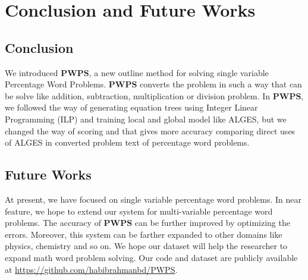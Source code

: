 \documentclass[document.tex]{subfiles}
\begin{document}
\chapter{Conclusion and Future Works}

\section{Conclusion}
We introduced \textbf{PWPS}, a new outline method for solving single variable Percentage Word Problems. \textbf{PWPS} converts the problem in such a way that can be solve like addition, subtraction, multiplication or division problem. In \textbf{PWPS}, we followed the way of generating equation trees using Integer Linear Programming (ILP) and training local and global model like ALGES, but we changed the way of scoring and that gives more accuracy comparing direct uses of ALGES in converted problem text of percentage word problems.

\section{Future Works}

At present, we have focused on single variable percentage word problems. In near feature, we hope to extend our system for multi-variable percentage word problems. The accuracy of \textbf{PWPS} can be further improved by optimizing the errors. Moreover, this system can be farther expanded to other domains like physics, chemistry and so on. We hope our dataset will help the researcher to expand math word problem solving. Our code and dataset are publicly available at \url{https://github.com/habibrahmanbd/PWPS}.
\end{document}
